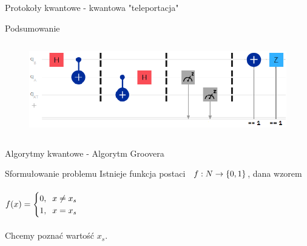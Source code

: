 \documentclass{beamer}
\begin{document}
\begin{frame}{Protokoły kwantowe - kwantowa "teleportacja"}
{\begin{block}{Podsumowanie}
\begin{columns}
					\begin{column}{0.65\textwidth}
						\begin{flushleft}
							\begin{figure}
								\includegraphics[scale=0.25]{media/QantumTeleportationCircuit.png}
							\end{figure}			
						\end{flushleft}	
					\end{column}
				\end{columns}
				\vspace{0.5em}
			\end{block}
		}
	\end{frame}

	\begin{frame}{Algorytmy kwantowe - Algorytm Groovera}
		\begin{block}{Sformułowanie problemu}
			\vspace{0.5em}
			Istnieje funkcja postaci 
			$\hspace{0.2cm}f:N\rightarrow \{0,1\}$, dana wzorem\\~\\
			\centering
			$
			f(x)=
			\begin{cases}
			0,\hspace{0.2cm} x \neq x_{s}\\
			1,\hspace{0.2cm} x = x_{s}\\
			\end{cases}
			\vspace{0.5em}
			$\\~\\
			Chcemy poznać wartość $x_{s}$.
		\end{block}
	\end{frame}
	
\end{document}
